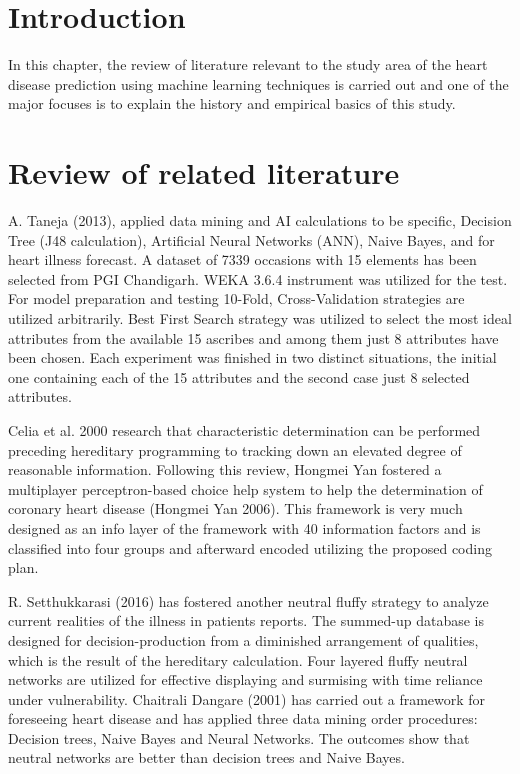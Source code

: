 \section{Introduction}
In this chapter, the review of literature relevant to the study area of the heart disease prediction using machine learning techniques is carried out and one of the major focuses is to explain the history and empirical basics of this study.

\section{Review of related literature}
A. Taneja (2013), applied data mining and AI calculations to be specific, Decision Tree (J48 calculation), Artificial Neural Networks (ANN), Naive Bayes, and for heart illness forecast. A dataset of 7339 occasions with 15 elements has been selected from PGI Chandigarh. WEKA 3.6.4 instrument was utilized for the test. For model preparation and testing 10-Fold, Cross-Validation strategies are utilized arbitrarily. Best First Search strategy was utilized to select the most ideal attributes from the available 15 ascribes and among them just 8 attributes have been chosen. Each experiment was finished in two distinct situations, the initial one containing each of the 15 attributes and the second case just 8 selected attributes.

Celia et al. 2000 research that characteristic determination can be performed preceding hereditary programming to tracking down an elevated degree of reasonable information. Following this review, Hongmei Yan fostered a multiplayer perceptron-based choice help system to help the determination of coronary heart disease (Hongmei Yan 2006). This framework is very much designed as an info layer of the framework with 40 information factors and is classified into four groups and afterward encoded utilizing the proposed coding plan.

R. Setthukkarasi (2016) has fostered another neutral fluffy strategy to analyze current realities of the illness in patients reports. The summed-up database is designed for decision-production from a diminished arrangement of qualities, which is the result of the hereditary calculation. Four layered fluffy neutral networks are utilized for effective displaying and surmising with time reliance under vulnerability. Chaitrali Dangare (2001) has carried out a framework for foreseeing heart disease and has applied three data mining order procedures: Decision trees, Naive Bayes and Neural Networks. The outcomes show that neutral networks are better than decision trees and Naive Bayes.

